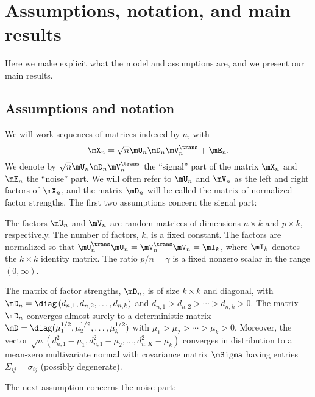 \section{Assumptions, notation, and main results}

Here we make explicit what the model and assumptions are, and we present our
main results.

\subsection{Assumptions and notation}

We will work sequences of matrices indexed by $n$, with
\[
    \mX_n = \sqrt{n} \mU_n \mD_n \mV_n^\trans + \mE_n.
\]
We denote by $\sqrt{n} \mU_n \mD_n \mV_n^\trans$ the ``signal'' part of the
matrix $\mX_n$ and $\mE_n$ the ``noise'' part. We will often refer to $\mU_n$
and $\mV_n$ as the left and right factors of $\mX_n$, and the matrix $\mD_n$
will be called the matrix of normalized factor strengths. The first two
assumptions concern the signal part:

\begin{assumption}\label{A:factors}
    The factors $\mU_n$ and $\mV_n$ are random matrices of dimensions
    $n \times k$ and $p \times k$, respectively.  The number of factors, $k$,
    is a fixed constant.  The factors are normalized so that
    $\mU_n^\trans \mU_n =  \mV_n^\trans \mV_n = \mI_k$, where $\mI_k$ denotes 
    the $k \times k$ identity matrix.  The ratio $p/n = \gamma$ is a fixed 
    nonzero scalar in the range $(0,\infty)$.
\end{assumption}
\noindent

\begin{assumption}\label{A:sizes}
    The matrix of factor strengths, $\mD_n$, is of size $k\times k$ and 
    diagonal, with 
    \(
        \mD_n = \diag \left( d_{n,1}, d_{n,2}, \ldots, d_{n,k} \right)
    \)
    and
    $d_{n,1} > d_{n,2} > \cdots > d_{n,k} > 0$.  The matrix $\mD_n$ converges
    almost surely to a deterministic matrix 
    $\mD = \diag( \mu_1^{1/2}, \mu_2^{1/2}, \ldots, \mu_k^{1/2})$ with
    $\mu_1 > \mu_2 > \cdots > \mu_k > 0$. Moreover, the vector
    \(
        \sqrt{n} ( d_{n,1}^2 - \mu_1, d_{n,1}^2 - \mu_2, 
                   \ldots, 
                   d_{n,K}^2 - \mu_k )
    \)
    converges in distribution to a mean-zero multivariate normal with 
    covariance matrix $\mSigma$ having entries $\Sigma_{ij} = \sigma_{ij}$
    (possibly degenerate).
\end{assumption}
\noindent
The next assumption concerns the noise part:

